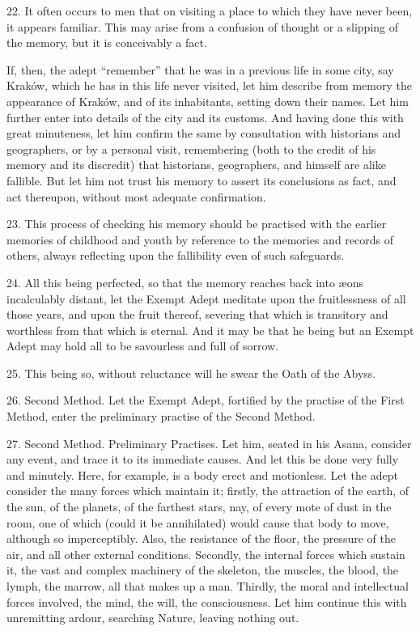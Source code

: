 22. It often occurs to men that on visiting a place to which they have never been, it appears familiar. This may arise from a confusion of thought or a slipping of the memory, but it is conceivably a fact.

If, then, the adept \enquote{remember} that he was in a previous life in some city, say Krak\'{o}w, which he has in this life never visited, let him describe from memory the appearance of Krak\'{o}w, and of its inhabitants, setting down their names. Let him further enter into details of the city and its customs. And having done this with great minuteness, let him confirm the same by consultation with historians and geographers, or by a personal visit, remembering (both to the credit of his memory and its discredit) that historians, geographers, and himself are alike fallible. But let him not trust his memory to assert its conclusions as fact, and act thereupon, without most adequate confirmation.

23. This process of checking his memory should be practised with the earlier memories of childhood and youth by reference to the memories and records of others, always reflecting upon the fallibility even of such safeguards.

24. All this being perfected, so that the memory reaches back into \ae{}ons incalculably distant, let the Exempt Adept meditate upon the fruitlessness of all those years, and upon the fruit thereof, severing that which is transitory and worthless from that which is eternal. And it may be that he being but an Exempt Adept may hold all to be savourless and full of sorrow.

25. This being so, without reluctance will he swear the Oath of the Abyss.

26. Second Method. Let the Exempt Adept, fortified by the practise of the First Method, enter the preliminary practise of the Second Method.

27. Second Method. Preliminary Practises. Let him, seated in his Asana, consider any event, and trace it to its immediate causes. And let this be done very fully and minutely. Here, for example, is a body erect and motionless. Let the adept consider the many forces which maintain it; firstly, the attraction of the earth, of the sun, of the planets, of the farthest stars, nay, of every mote of dust in the room, one of which (could it be annihilated) would cause that body to move, although so imperceptibly. Also, the resistance of the floor, the pressure of the air, and all other external conditions. Secondly, the internal forces which sustain it, the vast and complex machinery of the skeleton, the muscles, the blood, the lymph, the marrow, all that makes up a man. Thirdly, the moral and intellectual forces involved, the mind, the will, the consciousness. Let him continue this with unremitting ardour, searching Nature, leaving nothing out.

